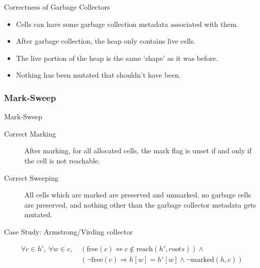 \documentclass[usenames,dvipsnames]{beamer}
\renewcommand{\iff}{\Leftrightarrow}
\renewcommand{\implies}{\Rightarrow}
\newcommand{\reach}[2]{\mathrm{reach}\left(#1, #2\right)}
\newcommand{\free}[1]{\mathrm{free}\left(#1\right)}
\newcommand{\marked}[2]{\mathrm{marked}\left(#1, #2\right)}
\begin{document}
\begin{frame}{Correctness of Garbage Collectors}
  \begin{itemize}
  \item Cells can have some garbage collection metadata associated
    with them.
  \item After garbage collection, the heap only contains live cells.
  \item The live portion of the heap is the same `shape' as it was
    before.
  \item Nothing has been mutated that shouldn't have been.
  \end{itemize}


\end{frame}

\subsubsection{Mark-Sweep}

\begin{frame}{Mark-Sweep}
  \begin{description}
  \item[Correct Marking] After marking, for all allocated cells, the
    mark flag is unset if and only if the cell is not
    reachable.

  \item[Correct Sweeping] All cells which are marked are preserved and
    unmarked, no garbage cells are preserved, and nothing other than
    the garbage collector metadata gets mutated.
  \end{description}

  Case Study: Armstrong/Virding collector

  \begin{align*}
    \forall c \in h',\ \forall w \in c,\ &(\free{c} \iff c \notin
    \reach{h'}{roots}) \land\\
    &(\lnot\free{c} \implies h[w] = h'[w] \land
    \lnot\marked{h}{c}) 
  \end{align*}


\end{frame}
\end{document}
